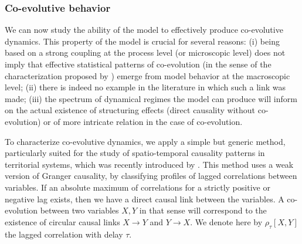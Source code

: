 \documentclass[11pt]{article}
\begin{document}
\subsubsection{Co-evolutive behavior}





We can now study the ability of the model to effectively produce co-evolutive dynamics. This property of the model is crucial for several reasons: (i) being based on a strong coupling at the process level (or microscopic level) does not imply that effective statistical patterns of co-evolution (in the sense of the characterization proposed by \cite{raimbault2018caracterisation}) emerge from model behavior at the macroscopic level; (ii) there is indeed no example in the literature in which such a link was made; (iii) the spectrum of dynamical regimes the model can produce will inform on the actual existence of structuring effects (direct causality without co-evolution) or of more intricate relation in the case of co-evolution.

To characterize co-evolutive dynamics, we apply a simple but generic method, particularly suited for the study of spatio-temporal causality patterns in territorial systems, which was recently introduced by \cite{raimbault2017identification}. This method uses a weak version of Granger causality, by classifying profiles of lagged correlations between variables. If an absolute maximum of correlations for a strictly positive or negative lag exists, then we have a direct causal link between the variables. A co-evolution between two variables $X,Y$ in that sense will correspond to the existence of circular causal links $X\rightarrow Y$ and $Y\rightarrow X$. We denote here by $\rho_{\tau}\left[X,Y\right]$ the lagged correlation with delay $\tau$.
\end{document}
